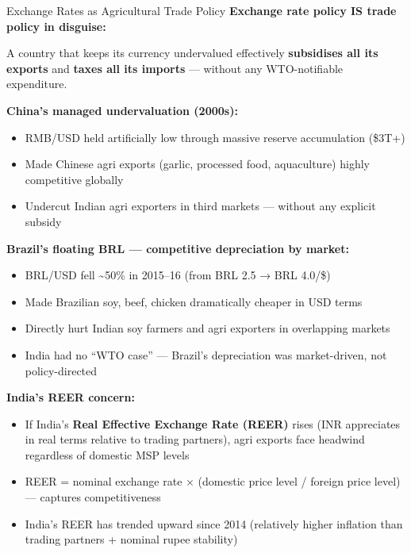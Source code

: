 \documentclass[
  ignorenonframetext,
  aspectratio=169,
]{beamer}
\makeatletter
\providecommand{\tightlist}{%
  \setlength{\itemsep}{0pt}\setlength{\parskip}{0pt}}
\let\quarto@originallabel\label
\DeclareRobustCommand*{\label}[1]{\quarto@originallabel{#1}}
\makeatother
\begin{document}
\begin{frame}{Exchange Rates as Agricultural Trade Policy}
\label{exchange-rates-as-agricultural-trade-policy}
\textbf{Exchange rate policy IS trade policy in disguise:}

A country that keeps its currency undervalued effectively
\textbf{subsidises all its exports} and \textbf{taxes all its imports}
--- without any WTO-notifiable expenditure.

\textbf{China's managed undervaluation (2000s):}

\begin{itemize}
\tightlist
\item
  RMB/USD held artificially low through massive reserve accumulation
  (\$3T+)
\item
  Made Chinese agri exports (garlic, processed food, aquaculture) highly
  competitive globally
\item
  Undercut Indian agri exporters in third markets --- without any
  explicit subsidy
\end{itemize}

\textbf{Brazil's floating BRL --- competitive depreciation by market:}

\begin{itemize}
\tightlist
\item
  BRL/USD fell \textasciitilde50\% in 2015--16 (from BRL 2.5 → BRL
  4.0/\$)
\item
  Made Brazilian soy, beef, chicken dramatically cheaper in USD terms
\item
  Directly hurt Indian soy farmers and agri exporters in overlapping
  markets
\item
  India had no ``WTO case'' --- Brazil's depreciation was market-driven,
  not policy-directed
\end{itemize}

\textbf{India's REER concern:}

\begin{itemize}
\tightlist
\item
  If India's \textbf{Real Effective Exchange Rate (REER)} rises (INR
  appreciates in real terms relative to trading partners), agri exports
  face headwind regardless of domestic MSP levels
\item
  REER = nominal exchange rate × (domestic price level / foreign price
  level) --- captures competitiveness
\item
  India's REER has trended upward since 2014 (relatively higher
  inflation than trading partners + nominal rupee stability)
\end{itemize}


\end{frame}
\end{document}
